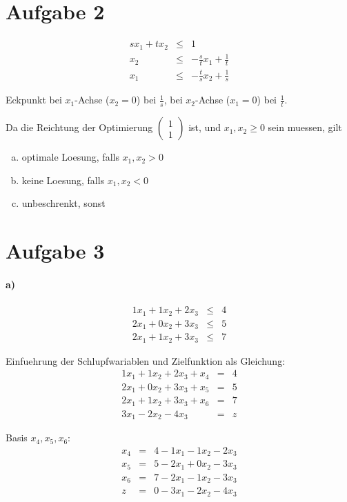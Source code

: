 \section*{Aufgabe 2}
\begin{eqnarray}
s x_1 + t x_2 &\leq& 1\\
x_2 &\leq& -\frac{s}{t} x_1 + \frac{1}{t}\\
x_1 &\leq& -\frac{t}{s} x_2 + \frac{1}{s}
\end{eqnarray}

Eckpunkt bei $x_1$-Achse ($x_2=0$) bei $\frac{1}{s}$,
bei $x_2$-Achse ($x_1=0$) bei $\frac{1}{t}$.

Da die Reichtung der Optimierung $\left( \begin{matrix}1\\1\end{matrix} \right)$ ist,
und $x_1, x_2 \geq 0$ sein muessen, gilt

\begin{enumerate}[a)]
\item optimale Loesung, falls $x_1, x_2 > 0$
\item keine Loesung, falls $x_1, x_2 < 0$
\item unbeschrenkt, sonst
\end{enumerate}

\section*{Aufgabe 3}
\paragraph{a)}

\begin{eqnarray}
1 x_1 + 1 x_2 + 2 x_3 &\leq& 4 \\
2 x_1 + 0 x_2 + 3 x_3 &\leq& 5 \\
2 x_1 + 1 x_2 + 3 x_3 &\leq& 7
\end{eqnarray}

Einfuehrung der Schlupfwariablen und Zielfunktion als Gleichung:
\begin{eqnarray}
 1 x_1 + 1 x_2 + 2 x_3 + x_4 &=& 4 \\
 2 x_1 + 0 x_2 + 3 x_3 + x_5 &=& 5 \\
 2 x_1 + 1 x_2 + 3 x_3 + x_6 &=& 7 \\
 3 x_1 - 2 x_2 - 4 x_3       &=& z
\end{eqnarray}

Basis $x_4, x_5, x_6$:
\begin{eqnarray}
x_4 &=&  4 - 1 x_1 - 1 x_2 - 2 x_3 \\
x_5 &=&  5 - 2 x_1 + 0 x_2 - 3 x_3 \\
x_6 &=&  7 - 2 x_1 - 1 x_2 - 3 x_3 \\
z   &=&  0 - 3 x_1 - 2 x_2 - 4 x_3
\end{eqnarray}

